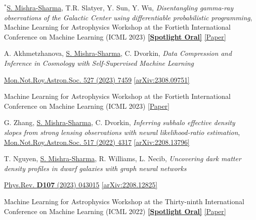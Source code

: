 \documentclass[letterpaper,11pt]{article}
\newenvironment{packed_itemize}{
\begin{itemize}[label=\raisebox{0.25ex}{\tiny$\bullet$}, topsep=0pt, partopsep=0pt]
  \setlength{\itemsep}{4.0pt}
  \setlength{\parskip}{0pt}
  \setlength{\parsep}{0pt}}{\end{itemize}
}
\newenvironment{packed_enumerate}[1][]{
\begin{etaremune}[#1]
  \setlength{\itemsep}{4.0pt}
  \setlength{\parskip}{0pt}
  \setlength{\parsep}{0pt}}{\end{etaremune}
}
\begin{document}
\begin{packed_enumerate}[start=63]
\begin{packed_itemize}
       \end{packed_itemize}
  \item $^*$\underline{S. Mishra-Sharma}, T.R. Slatyer, Y. Sun, Y. Wu, \emph{Disentangling gamma-ray observations of the Galactic Center using differentiable probabilistic programming}, {Machine Learning for Astrophysics Workshop at the Fortieth International Conference on Machine Learning (ICML 2023)} \href{https://ml4astro.github.io/icml2023/}{\textbf{[Spotlight Oral]}} \href{https://ml4astro.github.io/icml2023/assets/52.pdf}{[Paper]}
  \item A. Akhmetzhanova, \underline{S. Mishra-Sharma}, C. Dvorkin, \emph{Data Compression and Inference in Cosmology with Self-Supervised Machine Learning}
  \begin{packed_itemize}
      \item \href{https://doi.org/10.1093/mnras/stad3646}{Mon.Not.Roy.Astron.Soc. 527 (2023) 7459} \href{https://arxiv.org/abs/2308.09751}{[arXiv:2308.09751]}
      \item {Machine Learning for Astrophysics Workshop at the Fortieth International Conference on Machine Learning (ICML 2023)} \href{https://ml4astro.github.io/icml2023/assets/11.pdf}{[Paper]} 
       \end{packed_itemize}
      
  \item G. Zhang, \underline{S. Mishra-Sharma}, C. Dvorkin, \emph{Inferring subhalo effective density slopes from strong lensing observations with neural likelihood-ratio estimation}, \href{https://doi.org/10.1093/mnras/stac3014}{Mon.Not.Roy.Astron.Soc. 517 (2022) 4317} \href{https://arxiv.org/abs/2208.13796}{[arXiv:2208.13796]}
  \item T. Nguyen, \underline{S. Mishra-Sharma}, R. Williams, L. Necib, \emph{Uncovering dark matter density profiles in dwarf galaxies with graph neural networks}
  \begin{packed_itemize}
      \item {\href{https://journals.aps.org/prd/abstract/10.1103/PhysRevD.107.043015}{Phys.Rev. \textbf{D107} (2023) 043015}} \href{https://arxiv.org/abs/2208.12825}{[arXiv:2208.12825]}
      \item Machine Learning for Astrophysics Workshop at the Thirty-ninth International Conference on Machine Learning (ICML 2022) \href{https://ml4astro.github.io/icml2022/}{\textbf{[Spotlight Oral]}} \href{https://ml4astro.github.io/icml2022/assets/38.pdf}{[Paper]}
    \end{packed_itemize}
    

\end{packed_enumerate}
\end{document}
